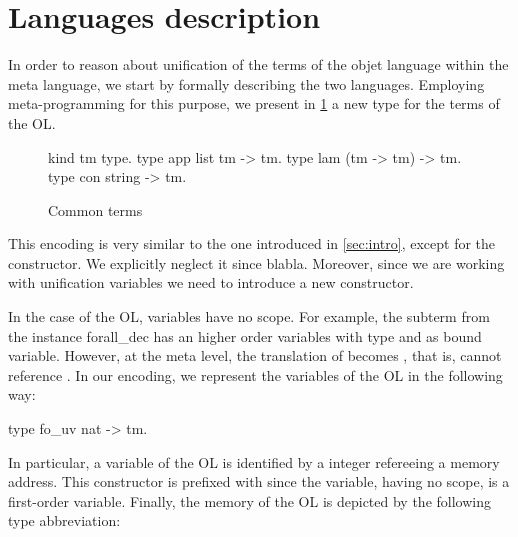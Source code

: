 \documentclass[sigconf,natbib=false]{acmart}
\begin{document}
\section{Languages description}
\label{sec:lang-spec}

% 


\def\eqfo{eq\_fo\xspace}

In order to reason about unification of the terms of the objet language within the
meta language, we start by formally describing the two languages. Employing
meta-programming for this purpose, we present in \cref{code:common-terms} a new type for the terms of
the OL.
%
\setlength{\abovecaptionskip}{0pt}
\setlength{\belowcaptionskip}{-13pt}

\begin{figure}[H]
  \begin{elpicode}
    kind tm type.
    type app list tm -> tm.
    type lam (tm -> tm) -> tm.
    type con string -> tm.
  \end{elpicode}
  \caption{Common terms}
  \label{code:common-terms}
\end{figure}
%
\noindent
This encoding is very similar to the one introduced in \cref{sec:intro}, except
for the  constructor. We explicitly neglect it since blabla.
Moreover, since we are working with unification variables we need to introduce a
new constructor. 

In the case of the OL, variables have no scope. For example, the subterm
 from the instance forall\_dec has  an higher order
variables with type  and  as bound variable. 
However, at the meta level, the translation of  becomes
, that is,  cannot reference . In our
encoding, we represent the variables of the OL in the following way:

\begin{elpicode}
  type fo_uv nat -> tm.
\end{elpicode}

\noindent 
In particular, a variable of the OL is identified by a integer
refereeing a memory address. This constructor is prefixed with  since
the variable, having no scope, is a first-order variable. Finally, the memory of
the OL is depicted by the following type abbreviation:
\end{document}
